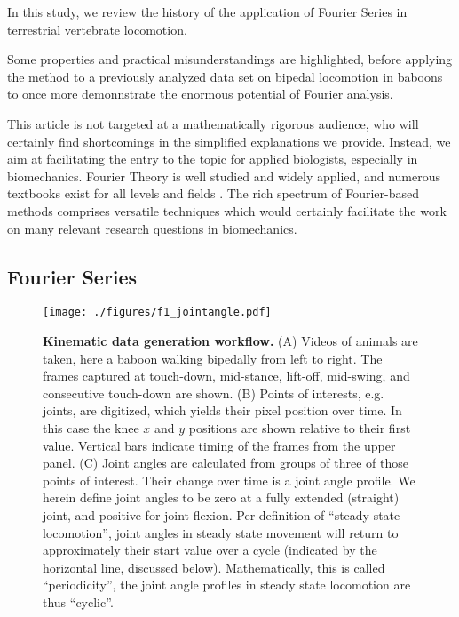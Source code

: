 In this study, we review the history of the application of Fourier Series in terrestrial vertebrate locomotion.

Some properties and practical misunderstandings are highlighted, before applying the method to a previously analyzed data set on bipedal locomotion in baboons \citep{Druelle2021} to once more demonnstrate the enormous potential of Fourier analysis.

This article is not targeted at a mathematically rigorous audience, who will certainly find shortcomings in the simplified explanations we provide.
Instead, we aim at facilitating the entry to the topic for applied biologists, especially in biomechanics.
Fourier Theory is well studied and widely applied, and numerous textbooks exist for all levels and fields \citep[\textit{cf.}][]{Bracewell2000,Osgood2019}.
The rich spectrum of Fourier-based methods comprises versatile techniques which would certainly facilitate the work on many relevant research questions in biomechanics.


\subsection{Fourier Series}
\label{sec:org276a6b8}

\begin{figure}[pt]
\centering
\texttt{[image: ./figures/f1\_jointangle.pdf]}
\caption{\label{fig:jointangle}\textbf{Kinematic data generation workflow.} (A) Videos of animals are taken, here a baboon walking bipedally from left to right. The frames captured at touch-down, mid-stance, lift-off, mid-swing, and consecutive touch-down are shown. (B) Points of interests, e.g. joints, are digitized, which yields their pixel position over time. In this case the knee \(x\) and \(y\) positions are shown relative to their first value. Vertical bars indicate timing of the frames from the upper panel. (C) Joint angles are calculated from groups of three of those points of interest. Their change over time is a joint angle profile. We herein define joint angles to be zero at a fully extended (straight) joint, and positive for joint flexion. Per definition of ``steady state locomotion'', joint angles in steady state movement will return to approximately their start value over a cycle (indicated by the horizontal line, discussed below). Mathematically, this is called ``periodicity'', the joint angle profiles in steady state locomotion are thus ``cyclic''.}
\end{figure}

